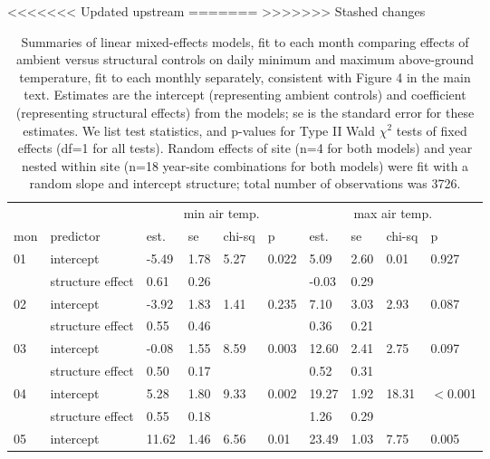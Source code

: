 \documentclass{article}
\begin{document}
<<<<<<< Updated upstream
=======
>>>>>>> Stashed changes
\begin{table}[ht]
\centering
\caption{Summaries of linear mixed-effects models, fit to each month comparing effects of ambient versus structural controls on daily minimum and maximum above-ground temperature, fit to each monthly separately, consistent with Figure 4 in the main text. Estimates are the intercept (representing ambient controls) and coefficient (representing structural effects) from the models; se is the standard error for these estimates. We list test statistics, and p-values for Type II Wald $\chi^{2}$ tests of fixed effects (df=1 for all tests). Random effects of site (n=4 for both models) and year nested within site (n=18 year-site combinations for both models) were fit with a random slope and intercept structure; total number of observations was 3726.} 
\label{table:shamamb_atempm}
\begin{tabular}{|p{}|p{}|p{}p{}p{}p{}|p{}p{}p{}p{}|}
  \hline
  & &\multicolumn{4}{c}{min air temp.} &\multicolumn{4}{c}{max air temp.}\\
 mon & predictor & est. & se & chi-sq & p & est. & se & chi-sq & p\\
 \hline
01 & intercept & -5.49 & 1.78 & 5.27 & 0.022 & 5.09 & 2.60 & 0.01 & 0.927 \\ 
    & structure effect & 0.61 & 0.26 &  &  & -0.03 & 0.29 &  &  \\ 
   \hline
02 & intercept & -3.92 & 1.83 & 1.41 & 0.235 & 7.10 & 3.03 & 2.93 & 0.087 \\ 
    & structure effect & 0.55 & 0.46 &  &  & 0.36 & 0.21 &  &  \\ 
   \hline
03 & intercept & -0.08 & 1.55 & 8.59 & 0.003 & 12.60 & 2.41 & 2.75 & 0.097 \\ 
    & structure effect & 0.50 & 0.17 &  &  & 0.52 & 0.31 &  &  \\ 
   \hline
04 & intercept & 5.28 & 1.80 & 9.33 & 0.002 & 19.27 & 1.92 & 18.31 & $<$0.001 \\ 
    & structure effect & 0.55 & 0.18 &  &  & 1.26 & 0.29 &  &  \\ 
   \hline
05 & intercept & 11.62 & 1.46 & 6.56 & 0.01 & 23.49 & 1.03 & 7.75 & 0.005 \\ 

\end{tabular}
\end{table}
\end{document}
